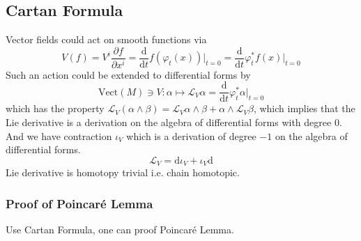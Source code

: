 \documentclass[10pt]{article}
\begin{document}
\subsection{Cartan Formula}

Vector fields could act on smooth functions via
\begin{equation*}
  V(f) = V^{i} \frac{\partial f}{\partial x^{i}} = \frac{\mathrm{d} }{\mathrm{d} t} f(\varphi_{t}(x)) \bigg|_{t=0} = \frac{\mathrm{d} }{\mathrm{d} t} \varphi_{t}^{*} f(x) \bigg|_{t=0}
\end{equation*}
Such an action could be extended to differential forms by
\begin{equation*}
  \mathrm{Vect}(M) \ni V : \alpha \mapsto \mathcal{L}_{V} \alpha = \frac{\mathrm{d} }{\mathrm{d} t} \varphi_{t}^{*} \alpha \bigg|_{t=0}
\end{equation*}
which has the property $ \mathcal{L}_{V}(\alpha \wedge \beta) = \mathcal{L}_{V} \alpha \wedge \beta + \alpha \wedge \mathcal{L}_{V} \beta$, which implies that the Lie derivative is a derivation on the algebra of differential forms with degree $ 0$. And we have contraction $ \iota_{V}$ which is a derivation of degree $ -1$ on the algebra of differential forms.
\begin{equation*}
  \mathcal{L}_{V}  = \mathrm{d} \iota_{V} + \iota_{V} \mathrm{d}
\end{equation*}
Lie derivative is homotopy trivial i.e. chain homotopic.

\subsubsection{Proof of Poincaré Lemma}
Use Cartan Formula, one can proof Poincaré Lemma.
\end{document}
